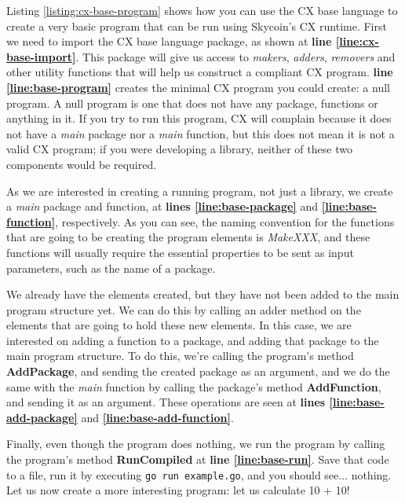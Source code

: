 \documentclass[11pt,fleqn,openany]{book} %
\begin{document}
Listing \ref{listing:cx-base-program} shows how you can use the CX base language to create a very basic program that can be run using Skycoin's CX runtime. First we need to import the CX base language package, as shown at \textbf{line \ref{line:cx-base-import}}. This package will give us access to \emph{makers}, \emph{adders}, \emph{removers} and other utility functions that will help us construct a compliant CX program. \textbf{line \ref{line:base-program}} creates the minimal CX program you could create: a null program. A null program is one that does not have any package, functions or anything in it. If you try to run this program, CX will complain because it does not have a \emph{main} package nor a \emph{main} function, but this does not mean it is not a valid CX program; if you were developing a library, neither of these two components would be required.

As we are interested in creating a running program, not just a library, we create a \emph{main} package and function, at \textbf{lines \ref{line:base-package}} and \textbf{\ref{line:base-function}}, respectively. As you can see, the naming convention for the functions that are going to be creating the program elements is \emph{MakeXXX}, and these functions will usually require the essential properties to be sent as input parameters, such as the name of a package.

We already have the elements created, but they have not been added to the main program structure yet. We can do this by calling an adder method on the elements that are going to hold these new elements. In this case, we are interested on adding a function to a package, and adding that package to the main program structure. To do this, we're calling the program's method \textbf{AddPackage}, and sending the created package as an argument, and we do the same with the \emph{main} function by calling the package's method \textbf{AddFunction}, and sending it as an argument. These operations are seen at \textbf{lines \ref{line:base-add-package}} and \textbf{\ref{line:base-add-function}}.

Finally, even though the program does nothing, we run the program by calling the program's method \textbf{RunCompiled} at \textbf{line \ref{line:base-run}}. Save that code to a file, run it by executing \lstinline{go run example.go}, and you should see... nothing. Let us now create a more interesting program: let us calculate 10 + 10!
\end{document}
